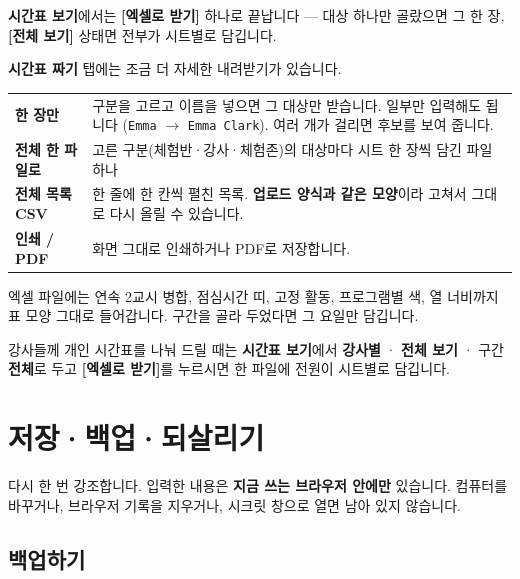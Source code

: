 \documentclass[11pt,a4paper]{article}
\newcommand{\btn}[1]{\textcolor{ttdark}{\sffamily\bfseries[#1]}}   %
\newcommand{\tab}[1]{\textcolor{ttblue}{\sffamily\bfseries#1}}      %
\newcommand{\code}[1]{\texttt{\small #1}}
\begin{document}
\tab{시간표 보기}에서는 \btn{엑셀로 받기} 하나로 끝납니다 — 대상 하나만 골랐으면 그 한 장,
\btn{전체 보기} 상태면 전부가 시트별로 담깁니다.

\tab{시간표 짜기} 탭에는 조금 더 자세한 내려받기가 있습니다.

\begin{center}
\begin{tabularx}{\linewidth}{@{}>{\sffamily\bfseries\color{ttdark}}l X@{}}
\toprule
한 장만 & 구분을 고르고 이름을 넣으면 그 대상만 받습니다. 일부만 입력해도 됩니다
  (\code{Emma} $\rightarrow$ \code{Emma Clark}). 여러 개가 걸리면 후보를 보여 줍니다. \\
전체 한 파일로 & 고른 구분(체험반·강사·체험존)의 대상마다 시트 한 장씩 담긴 파일 하나 \\
전체 목록 CSV & 한 줄에 한 칸씩 펼친 목록. \textbf{업로드 양식과 같은 모양}이라 고쳐서 그대로 다시 올릴 수 있습니다. \\
인쇄 / PDF & 화면 그대로 인쇄하거나 PDF로 저장합니다. \\
\bottomrule
\end{tabularx}
\end{center}

엑셀 파일에는 연속 2교시 병합, 점심시간 띠, 고정 활동, 프로그램별 색, 열 너비까지 표 모양 그대로 들어갑니다.
구간을 골라 두었다면 그 요일만 담깁니다.

\begin{tip}
강사들께 개인 시간표를 나눠 드릴 때는 \tab{시간표 보기}에서 \textbf{강사별} · \textbf{전체 보기} · 구간 \textbf{전체}로 두고
\btn{엑셀로 받기}를 누르시면 한 파일에 전원이 시트별로 담깁니다.
\end{tip}

\section{저장·백업·되살리기}\label{sec:backup}

\begin{danger}
다시 한 번 강조합니다. 입력한 내용은 \textbf{지금 쓰는 브라우저 안에만} 있습니다.
컴퓨터를 바꾸거나, 브라우저 기록을 지우거나, 시크릿 창으로 열면 남아 있지 않습니다.
\end{danger}

\subsection{백업하기}
\end{document}
